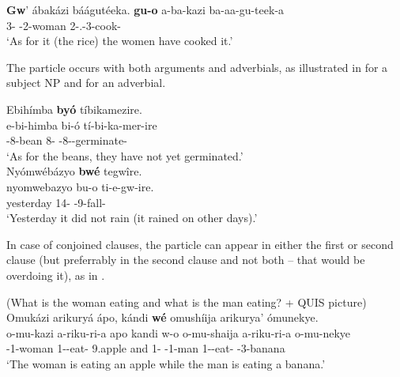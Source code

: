 \documentclass[output=paper]{langscibook}
\begin{document}
\ex
\label{bkm:Ref113699913:b}
\textbf{Gw}’ ábakázi báágutéeka.  \jambox*{[\CM{} + \OM{}]}
\gll
\textbf{gu-o}  a-ba-kazi  ba-aa-gu-teek-a\\
3-\CM{}  \AUG{}-{}2-woman  2\SM{}-\N{}.\PST{}-3\OM{}-{}cook-\FV{}\\
\glt
‘As for it (the rice) the women have cooked it.’\\


\z
\z

The particle occurs with both arguments and adverbials, as illustrated in  for a subject NP and  for an adverbial.

\ea
\label{bkm:Ref111472803}
\ea
\label{bkm:Ref111472803:a} 
Ebihímba \textbf{byó} tíbikamezire.\\
\gll
e-bi-himba  bi-ó  tí-bi-ka-mer-ire\\
\AUG{}-8-bean  8-\CM{}  \NEG{}-8\SM{}-\NEG{}-germinate-\PFV{}\\
\glt
`As for the beans, they have not yet germinated.’\\

\ex
\label{bkm:Ref111472803:b}
Nyómwébázyo  \textbf{bwé}  tegwîre.\\
\gll
nyomwebazyo  bu-o  ti-e-gw-ire.\\
yesterday  14-\CM{}  \NEG{}-9\SM{}-fall-\PFV{}\\
\glt
‘Yesterday it did not rain (it rained on other days).’\\


\z
\z

In case of conjoined clauses, the particle can appear in either the first or second clause (but preferrably in the second clause and not both – that would be overdoing it), as in .

\ea
\label{bkm:Ref37771777}
\ea
(What is the woman eating and what is the man eating? + QUIS picture)\\
  Omukázi arikuryá ápo, kándi \textbf{wé} omushíija arikurya’ ómunekye.\\
\gll
  o-mu-kazi  a-riku-ri-a  apo  kandi  w-o  o-mu-shaija    a-riku-ri-a  o-mu-nekye\\
\AUG{}-{}1-woman  1\SM{}-\IPFV{}-eat-\FV{}  9.apple  and  1-\CM{}  \AUG{}-{}1-man 1\SM{}-\IPFV{}-eat-\FV{}  \AUG{}-{}3-banana\\
\glt
  \glt ‘The woman is eating an apple while the man is eating a banana.’\\
\end{document}
